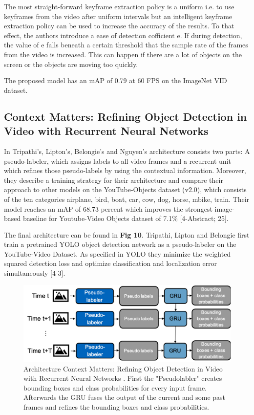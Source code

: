 \documentclass[conference]{IEEEtran}
\begin{document}
The most straight-forward keyframe extraction policy is a uniform i.e. to use keyframes from the video after uniform intervals but an intelligent keyframe extraction policy can be used to increase the accuracy of the results. To that effect, the authors introduce a ease of detection cofficient e. If during detection, the value of e falls beneath a certain threshold that the sample rate of the frames from the video is increased. This can happen if there are a lot of objects on the screen or the objects are moving too quickly. \newline

The proposed model has an mAP of 0.79 at 60 FPS on the ImageNet VID dataset. \newline

\subsection{Context Matters: Refining Object Detection in Video with Recurrent Neural Networks \cite{b4}}
In \cite{b4} Tripathi's, Lipton's, Belongie's and Nguyen's architecture consists two parts: A pseudo-labeler, which assigns labels to all video frames and a recurrent unit which refines those pseudo-labels by using the contextual information. Moreover, they describe a training strategy for their architecture and compare their approach to other models on the YouTube-Objects dataset (v2.0), which consists of the ten categories airplane, bird, boat, car, cow, dog, horse, mbike, train. Their model reaches an mAP of 68.73 percent which improves the strongest image-based baseline for Youtube-Video Objects dataset of 7.1\% [4-Abstract; 25]. \newline

The final architecture can be found in \textbf{Fig 10}. Tripathi, Lipton and Belongie first train a pretrained YOLO object detection network \cite{b20} as a  pseudo-labeler on the YouTube-Video Dataset. As specified in YOLO  they minimize the weighted squared detection loss and optimize classification and localization error simultaneously [4-3]. 

\begin{figure} [h]
\includegraphics[width=\columnwidth]{ContextMatters}
\caption{Architecture Context Matters: Refining Object Detection in Video with Recurrent Neural Networks \cite{b4}. First the "Pseudolabler" creates bounding boxes and class probabilities for every input frame. Afterwards the GRU fuses the output of the current and some past frames and refines the bounding boxes and class probabilities.}
\end{figure}
\end{document}

